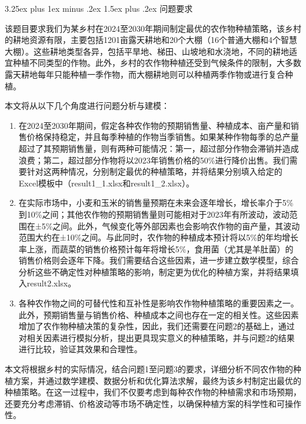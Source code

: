 \documentclass[12pt,a4paper]{nmmcm}
\makeatletter
\renewcommand\subsection{\@startsection{subsection}{2}{0pt}%
    {3.25ex plus 1ex minus .2ex}%
    {1.5ex plus .2ex}%
    {\normalfont\Large\bfseries}}
\makeatother
\begin{document}
\subsection{问题要求}

该题目要求我们为某乡村在2024至2030年期间制定最优的农作物种植策略，该乡村的耕地资源有限，主要包括1201亩露天耕地和20个大棚（16个普通大棚和4个智慧大棚）。这些耕地类型各异，包括平旱地、梯田、山坡地和水浇地，不同的耕地适宜种植不同类型的作物。此外，乡村的农作物种植还受到气候条件的限制，大多数露天耕地每年只能种植一季作物，而大棚耕地则可以种植两季作物或进行复合种植。

本文将从以下几个角度进行问题分析与建模：
\begin{enumerate}
  \item 在2024至2030年期间，假定各种农作物的预期销售量、种植成本、亩产量和销售价格保持稳定，并且每季种植的作物当季销售。如果某种作物每季的总产量超过了其预期销售量，则有两种可能情况：第一，超过部分作物会滞销并造成浪费；第二，超过部分作物将以2023年销售价格的50\%进行降价出售。我们需要针对这两种情况，分别制定最优的种植策略，并将结果分别填入给定的Excel模板中（result1\_1.xlsx和result1\_2.xlsx）。

  \item 在实际市场中，小麦和玉米的销售量预期在未来会逐年增长，增长率介于5\%到10\%之间；其他农作物的预期销售量则可能相对于2023年有所波动，波动范围在±5\%之间。此外，气候变化等外部因素也会影响农作物的亩产量，其波动范围大约在±10\%之间。与此同时，农作物的种植成本预计将以5\%的年均增长率上涨，而蔬菜的销售价格预计每年将增长5\%，食用菌（尤其是羊肚菌）的销售价格则会逐年下降。我们需要结合这些因素，进一步建立数学模型，综合分析这些不确定性对种植策略的影响，制定更为优化的种植方案，并将结果填入result2.xlsx。

  \item 各种农作物之间的可替代性和互补性是影响农作物种植策略的重要因素之一。此外，预期销售量与销售价格、种植成本之间也存在一定的相关性。这些因素增加了农作物种植决策的复杂性，因此，我们还需要在问题2的基础上，通过对相关因素进行模拟分析，提出更具现实意义的种植策略，并与问题2的结果进行比较，验证其效果和合理性。
\end{enumerate}

本文将根据乡村的实际情况，结合问题1至问题3的要求，详细分析不同农作物的种植方案，并通过数学建模、数据分析和优化算法求解，最终为该乡村制定出最优的种植策略。在这一过程中，我们不仅要考虑到每种农作物的种植需求和市场预期，还要充分考虑滞销、价格波动等市场不确定性，以确保种植方案的科学性和可操作性。
\end{document}
